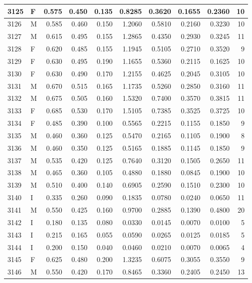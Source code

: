 \documentclass[9pt,twocolumn,twoside,]{pnas-new}
\begin{document}
\begin{tabular}{l|l|r|r|r|r|r|r|r|r}
\hline
3125 & F & 0.575 & 0.450 & 0.135 & 0.8285 & 0.3620 & 0.1655 & 0.2360 & 10\\
\hline
3126 & M & 0.585 & 0.460 & 0.150 & 1.2060 & 0.5810 & 0.2160 & 0.3230 & 10\\
\hline
3127 & M & 0.615 & 0.495 & 0.155 & 1.2865 & 0.4350 & 0.2930 & 0.3245 & 11\\
\hline
3128 & F & 0.620 & 0.485 & 0.155 & 1.1945 & 0.5105 & 0.2710 & 0.3520 & 9\\
\hline
3129 & F & 0.630 & 0.495 & 0.190 & 1.1655 & 0.5360 & 0.2115 & 0.1625 & 10\\
\hline
3130 & F & 0.630 & 0.490 & 0.170 & 1.2155 & 0.4625 & 0.2045 & 0.3105 & 10\\
\hline
3131 & M & 0.670 & 0.515 & 0.165 & 1.1735 & 0.5260 & 0.2850 & 0.3160 & 11\\
\hline
3132 & M & 0.675 & 0.505 & 0.160 & 1.5320 & 0.7400 & 0.3570 & 0.3815 & 11\\
\hline
3133 & F & 0.685 & 0.530 & 0.170 & 1.5105 & 0.7385 & 0.3525 & 0.3725 & 10\\
\hline
3134 & F & 0.485 & 0.390 & 0.100 & 0.5565 & 0.2215 & 0.1155 & 0.1850 & 9\\
\hline
3135 & M & 0.460 & 0.360 & 0.125 & 0.5470 & 0.2165 & 0.1105 & 0.1900 & 8\\
\hline
3136 & M & 0.460 & 0.350 & 0.125 & 0.5165 & 0.1885 & 0.1145 & 0.1850 & 9\\
\hline
3137 & M & 0.535 & 0.420 & 0.125 & 0.7640 & 0.3120 & 0.1505 & 0.2650 & 11\\
\hline
3138 & M & 0.465 & 0.360 & 0.105 & 0.4880 & 0.1880 & 0.0845 & 0.1900 & 10\\
\hline
3139 & M & 0.510 & 0.400 & 0.140 & 0.6905 & 0.2590 & 0.1510 & 0.2300 & 10\\
\hline
3140 & I & 0.335 & 0.260 & 0.090 & 0.1835 & 0.0780 & 0.0240 & 0.0650 & 11\\
\hline
3141 & M & 0.550 & 0.425 & 0.160 & 0.9700 & 0.2885 & 0.1390 & 0.4800 & 20\\
\hline
3142 & I & 0.180 & 0.135 & 0.080 & 0.0330 & 0.0145 & 0.0070 & 0.0100 & 5\\
\hline
3143 & I & 0.215 & 0.165 & 0.055 & 0.0590 & 0.0265 & 0.0125 & 0.0185 & 5\\
\hline
3144 & I & 0.200 & 0.150 & 0.040 & 0.0460 & 0.0210 & 0.0070 & 0.0065 & 4\\
\hline
3145 & F & 0.625 & 0.480 & 0.200 & 1.3235 & 0.6075 & 0.3055 & 0.3550 & 9\\
\hline
3146 & M & 0.550 & 0.420 & 0.170 & 0.8465 & 0.3360 & 0.2405 & 0.2450 & 13\\

\end{tabular}
\end{document}
